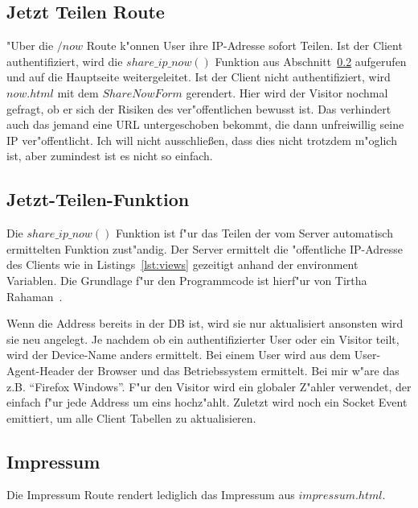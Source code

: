 \subsection{Jetzt Teilen Route}\label{subsec:jetzt-teilen-roote}
{"U}ber die $/now$ Route k{"o}nnen User ihre IP-Adresse sofort Teilen.
Ist der Client authentifiziert, wird die $share\_ip\_now()$ Funktion aus Abschnitt~\ref{subsec:jetzt-teilen-funktion} aufgerufen und auf die Hauptseite weitergeleitet.
Ist der Client nicht authentifiziert, wird $now.html$ mit dem $ShareNowForm$ gerendert.
Hier wird der Visitor nochmal gefragt, ob er sich der Risiken des ver{"o}ffentlichen bewusst ist.
Das verhindert auch das jemand eine URL untergeschoben bekommt, die dann unfreiwillig seine IP ver{"o}ffentlicht.
Ich will nicht ausschlie\ss en, dass dies nicht trotzdem m{"o}glich ist, aber zumindest ist es nicht so einfach.

\subsection{Jetzt-Teilen-Funktion}\label{subsec:jetzt-teilen-funktion}
Die $share\_ip\_now()$ Funktion ist f{"u}r das Teilen der vom Server automatisch ermittelten Funktion zust{"a}ndig.
Der Server ermittelt die {"o}ffentliche IP-Adresse des Clients wie in Listings~\ref{lst:views} gezeitigt anhand der environment Variablen.
Die Grundlage f{"u}r den Programmcode ist hierf{"u}r von Tirtha Rahaman~\cite{getip}.

Wenn die Address bereits in der DB ist, wird sie nur aktualisiert ansonsten wird sie neu angelegt.
Je nachdem ob ein authentifizierter User oder ein Visitor teilt, wird der Device-Name anders ermittelt.
Bei einem User wird aus dem User-Agent-Header der Browser und das Betriebssystem ermittelt.
Bei mir w{"a}re das z.B. ``Firefox Windows''.
F{"u}r den Visitor wird ein globaler Z{"a}hler verwendet, der einfach f{"u}r jede Address um eins hochz{"a}hlt.
Zuletzt wird noch ein Socket Event emittiert, um alle Client Tabellen zu aktualisieren.

\subsection{Impressum}\label{subsec:impressum}
Die Impressum Route rendert lediglich das Impressum aus $impressum.html$.


